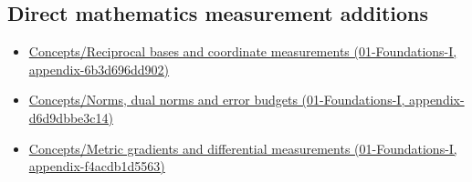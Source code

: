 \subsection{Direct mathematics measurement additions}\label{appendix-a6d556a4ef50-direct-mathematics-measurement-additions}

\begin{itemize}
\tightlist
\item
  \href{../01-Foundations-I/main.pdf\#nameddest=appendix-6b3d696dd902}{Concepts/Reciprocal bases and coordinate measurements (01-Foundations-I, appendix-6b3d696dd902)}
\item
  \href{../01-Foundations-I/main.pdf\#nameddest=appendix-d6d9dbbe3c14}{Concepts/Norms, dual norms and error budgets (01-Foundations-I, appendix-d6d9dbbe3c14)}
\item
  \href{../01-Foundations-I/main.pdf\#nameddest=appendix-f4acdb1d5563}{Concepts/Metric gradients and differential measurements (01-Foundations-I, appendix-f4acdb1d5563)}
\end{itemize}
